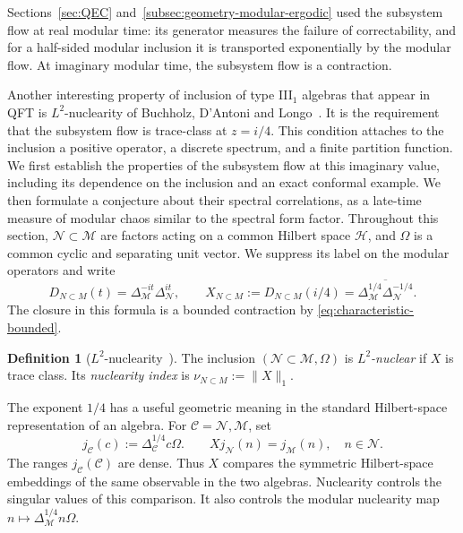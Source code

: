\documentclass[a4paper,11pt]{article}
\theoremstyle{definition}
\newtheorem{definition}{Definition}[section]
\begin{document}
Sections~\ref{sec:QEC} and~\ref{subsec:geometry-modular-ergodic} used the subsystem flow at real modular time: its generator measures the failure of correctability, and for a half-sided modular inclusion it is transported exponentially by the modular flow. At imaginary modular time, the subsystem flow is a contraction. 

Another interesting property of inclusion of type III$_1$ algebras that appear in QFT is $L^2$-nuclearity of Buchholz, D'Antoni and Longo~\cite{BDL2007}. It is the requirement that the subsystem flow is trace-class at $z=i/4$. This condition attaches to the inclusion a positive operator, a discrete spectrum, and a finite partition function. We first establish the properties of the subsystem flow at this imaginary value, including its dependence on the inclusion and an exact conformal example. We then formulate a conjecture about their spectral correlations, as a late-time measure of modular chaos similar to the spectral form factor. Throughout this section, $\mathcal N\subset\mathcal M$ are factors acting on a common Hilbert space $\mathcal H$, and $\Omega$ is a common cyclic and separating unit vector. We suppress its label on the modular operators and write
\begin{equation}
 D_{N\subset M}(t)=\Delta_{\mathcal M}^{-it}\Delta_{\mathcal N}^{it},
 \qquad
 X_{N\subset M}:=D_{N\subset M}(i/4)
 =\overline{\Delta_{\mathcal M}^{1/4}\Delta_{\mathcal N}^{-1/4}}.
 \label{eq:inclusion-X}
\end{equation}
The closure in this formula is a bounded contraction by \eqref{eq:characteristic-bounded}.

\begin{definition}[$L^2$-nuclearity~\cite{BDL2007}]\label{def:L2-nuclear}
The inclusion $(\mathcal N\subset\mathcal M,\Omega)$ is \emph{$L^2$-nuclear} if $X$ is trace class. Its \emph{nuclearity index} is $\nu_{N\subset M}:=\|X\|_1$.
\end{definition}

The exponent $1/4$ has a useful geometric meaning in the standard Hilbert-space representation of an algebra. For $\mathcal C=\mathcal N,\mathcal M$, set
\begin{equation}
 j_{\mathcal C}(c):=\Delta_{\mathcal C}^{1/4}c\Omega.
 \qquad
 Xj_{\mathcal N}(n)=j_{\mathcal M}(n),\quad n\in\mathcal N.
 \label{eq:inclusion-symmetric-embedding}
\end{equation}
The ranges $j_{\mathcal C}(\mathcal C)$ are dense. Thus $X$ compares the symmetric Hilbert-space embeddings of the same observable in the two algebras. Nuclearity controls the singular values of this comparison. It also controls the modular nuclearity map $n\mapsto\Delta_{\mathcal M}^{1/4}n\Omega$.
\end{document}
